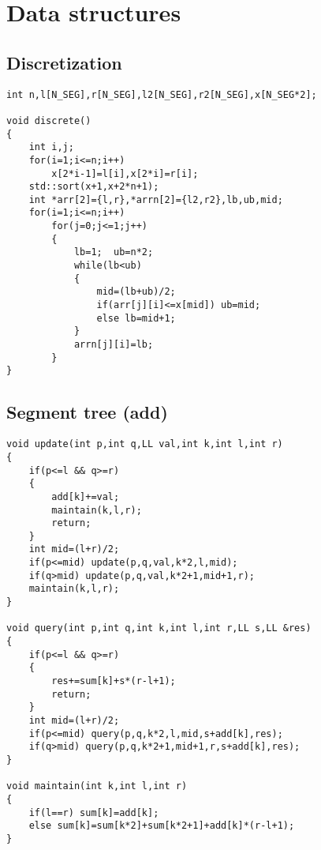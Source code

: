 \documentclass[a4paper,12pt]{article}
\begin{document}
\section{Data structures}
\subsection{Discretization}
\begin{lstlisting}
int n,l[N_SEG],r[N_SEG],l2[N_SEG],r2[N_SEG],x[N_SEG*2];

void discrete()
{
    int i,j;
    for(i=1;i<=n;i++)
        x[2*i-1]=l[i],x[2*i]=r[i];
    std::sort(x+1,x+2*n+1);
    int *arr[2]={l,r},*arrn[2]={l2,r2},lb,ub,mid;
    for(i=1;i<=n;i++)
        for(j=0;j<=1;j++)
        {
            lb=1;  ub=n*2;
            while(lb<ub)
            {
                mid=(lb+ub)/2;
                if(arr[j][i]<=x[mid]) ub=mid;
                else lb=mid+1;
            }
            arrn[j][i]=lb;
        }
}
\end{lstlisting}

\subsection{Segment tree (add)}
\begin{lstlisting}
void update(int p,int q,LL val,int k,int l,int r)
{
    if(p<=l && q>=r)
    {
        add[k]+=val;
        maintain(k,l,r);
        return;
    }
    int mid=(l+r)/2;
    if(p<=mid) update(p,q,val,k*2,l,mid);
    if(q>mid) update(p,q,val,k*2+1,mid+1,r);
    maintain(k,l,r);
}

void query(int p,int q,int k,int l,int r,LL s,LL &res)
{
    if(p<=l && q>=r)
    {
        res+=sum[k]+s*(r-l+1);
        return;
    }
    int mid=(l+r)/2;
    if(p<=mid) query(p,q,k*2,l,mid,s+add[k],res);
    if(q>mid) query(p,q,k*2+1,mid+1,r,s+add[k],res);
}

void maintain(int k,int l,int r)
{
    if(l==r) sum[k]=add[k];
    else sum[k]=sum[k*2]+sum[k*2+1]+add[k]*(r-l+1);
}

\end{lstlisting}
\end{document}

